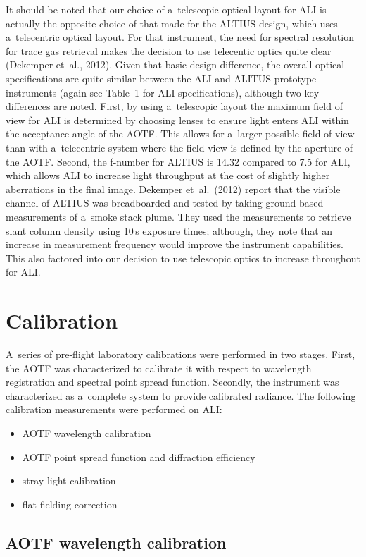 \documentclass[amtd, online, hvmath]{copernicus}
\begin{document}
It should be noted that our choice of a~telescopic optical layout for ALI is
actually the opposite choice of that made for the ALTIUS design, which uses
a~telecentric optical layout. For that instrument, the need for spectral
resolution for trace gas retrieval makes the decision to use telecentic
optics quite clear (Dekemper et~al., 2012). Given that basic design
difference, the overall optical specifications are quite similar between the
ALI and ALITUS prototype instruments (again see Table~1 for ALI
specifications), although two key differences are noted. First, by using
a~telescopic layout the maximum field of view for ALI is determined by
choosing lenses to ensure light enters ALI within the acceptance angle of the
AOTF. This allows for a~larger possible field of view than with a~telecentric
system where the field view is defined by the aperture of the AOTF. Second,
the f-number for ALTIUS is 14.32 compared to 7.5 for ALI, which allows ALI to
increase light throughput at the cost of slightly higher aberrations in the
final image. Dekemper et~al.~(2012) report that the visible channel of
ALTIUS was breadboarded and tested by taking ground based measurements of
a~smoke stack plume. They used the measurements to retrieve  slant
column density using 10\,s exposure times; although, they note that an
increase in measurement frequency would improve the instrument capabilities.
This also factored into our decision to use telescopic optics to increase
throughout for ALI.

\section{Calibration}

A~series of pre-flight laboratory calibrations were performed in two
stages.  First, the AOTF was characterized to calibrate it with
respect to wavelength registration and spectral point spread
function. Secondly, the instrument was characterized as a~complete
system to provide calibrated radiance. The following calibration
measurements were performed on ALI:
\begin{itemize}
\item AOTF wavelength calibration
\item AOTF point spread function and diffraction efficiency
\item stray light calibration
\item flat-fielding correction
\end{itemize}

\subsection{AOTF wavelength calibration}
\end{document}
